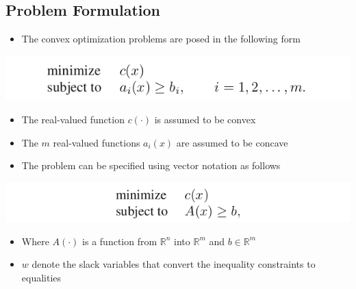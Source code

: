 \documentclass[11pt]{article}
\begin{document}
\subsection{Problem Formulation}
\label{sec:orgef5c9f9}
\begin{itemize}
\item The convex optimization problems are posed in the following form
\end{itemize}
\begin{center}
\includegraphics[width=.9\linewidth]{Convex Programming/screenshot_2019-03-17_16-23-01.png}
\end{center}
\begin{itemize}
\item The real-valued function \(c(\cdot)\) is assumed to be convex
\item The \(m\) real-valued functions \(a_i(x)\) are assumed to be concave
\item The problem can be specified using vector notation as follows
\end{itemize}
\begin{center}
\includegraphics[width=.9\linewidth]{Convex Programming/screenshot_2019-03-17_16-26-20.png}
\end{center}
\begin{itemize}
\item Where \(A(\cdot)\) is a function from \(\mathbb R^n\) into \(\mathbb R^m\) and \(b\in \mathbb R^m\)
\item \(w\) denote the slack variables that convert the inequality constraints to equalities
\end{itemize}
\end{document}
